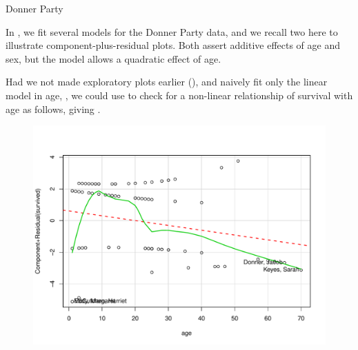 \documentclass[11pt]{book}
\renewenvironment{knitrout}{\small\renewcommand{\baselinestretch}{.85}}{} %
\begin{document}
\begin{Example}[donner3]{Donner Party}

In , we fit several models for the Donner Party
data, and we recall two here to illustrate component-plus-residual
plots.  Both assert additive effects of age and sex, but the model
 allows a quadratic effect of age.

\begin{knitrout}
\color{fgcolor}\begin{kframe}
\begin{alltt}
 \hlkwb{<-}  \hlopt{~}  \hlopt{+}   
 \hlkwb{<-}  \hlopt{~} \hlstd{)} \hlopt{+}   
\end{alltt}
\end{kframe}
\end{knitrout}
Had we not made exploratory plots earlier (), and naively
fit only the linear model in age, , we could use  to
check for a non-linear relationship of survival with age as follows, giving .

\begin{knitrout}
\color{fgcolor}\begin{kframe}
\begin{alltt}
 \hlopt{~} \hlstd{=}\hlstd{)}
\end{alltt}
\end{kframe}\begin{figure}[!htbp]


\centerline{\includegraphics[width=.6\textwidth]{ch07/fig/donner-cr1} }


\end{figure}
\end{knitrout}
\end{Example}
\end{document}

